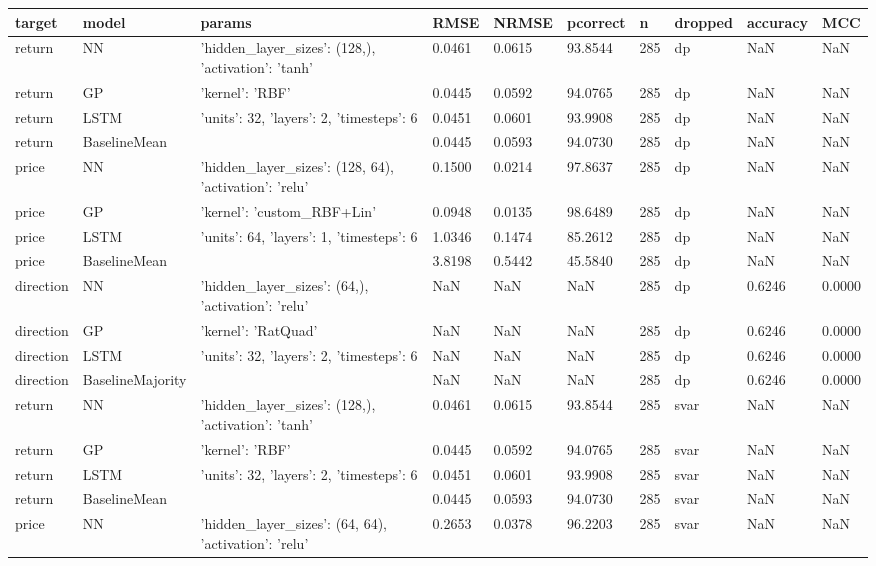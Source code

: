 \begin{table}[H]
\centering
\small
\begin{tabular}{llllllllll}
\toprule
target & model & params & RMSE & NRMSE & pcorrect & n & dropped & accuracy & MCC \\
\midrule
return & NN & {'hidden_layer_sizes': (128,), 'activation': 'tanh'} & 0.0461 & 0.0615 & 93.8544 & 285 & dp & NaN & NaN \\
return & GP & {'kernel': 'RBF'} & 0.0445 & 0.0592 & 94.0765 & 285 & dp & NaN & NaN \\
return & LSTM & {'units': 32, 'layers': 2, 'timesteps': 6} & 0.0451 & 0.0601 & 93.9908 & 285 & dp & NaN & NaN \\
return & BaselineMean & {} & 0.0445 & 0.0593 & 94.0730 & 285 & dp & NaN & NaN \\
price & NN & {'hidden_layer_sizes': (128, 64), 'activation': 'relu'} & 0.1500 & 0.0214 & 97.8637 & 285 & dp & NaN & NaN \\
price & GP & {'kernel': 'custom_RBF+Lin'} & 0.0948 & 0.0135 & 98.6489 & 285 & dp & NaN & NaN \\
price & LSTM & {'units': 64, 'layers': 1, 'timesteps': 6} & 1.0346 & 0.1474 & 85.2612 & 285 & dp & NaN & NaN \\
price & BaselineMean & {} & 3.8198 & 0.5442 & 45.5840 & 285 & dp & NaN & NaN \\
direction & NN & {'hidden_layer_sizes': (64,), 'activation': 'relu'} & NaN & NaN & NaN & 285 & dp & 0.6246 & 0.0000 \\
direction & GP & {'kernel': 'RatQuad'} & NaN & NaN & NaN & 285 & dp & 0.6246 & 0.0000 \\
direction & LSTM & {'units': 32, 'layers': 2, 'timesteps': 6} & NaN & NaN & NaN & 285 & dp & 0.6246 & 0.0000 \\
direction & BaselineMajority & {} & NaN & NaN & NaN & 285 & dp & 0.6246 & 0.0000 \\
return & NN & {'hidden_layer_sizes': (128,), 'activation': 'tanh'} & 0.0461 & 0.0615 & 93.8544 & 285 & svar & NaN & NaN \\
return & GP & {'kernel': 'RBF'} & 0.0445 & 0.0592 & 94.0765 & 285 & svar & NaN & NaN \\
return & LSTM & {'units': 32, 'layers': 2, 'timesteps': 6} & 0.0451 & 0.0601 & 93.9908 & 285 & svar & NaN & NaN \\
return & BaselineMean & {} & 0.0445 & 0.0593 & 94.0730 & 285 & svar & NaN & NaN \\
price & NN & {'hidden_layer_sizes': (64, 64), 'activation': 'relu'} & 0.2653 & 0.0378 & 96.2203 & 285 & svar & NaN & NaN \\

\end{tabular}
\end{table}
